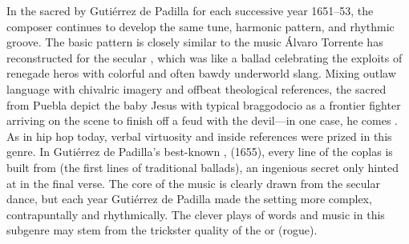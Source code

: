 In the sacred  by Gutiérrez de Padilla for each successive year
1651--53, the composer continues to develop the same tune, harmonic pattern,
and rhythmic groove.
The basic pattern is closely similar to the music Álvaro Torrente has
reconstructed for the secular , which was like a ballad
celebrating the exploits of renegade heros with colorful and often bawdy
underworld slang.%
    \Autocites
    {Torrente:Jacara}
    [512--514]{Torrente:VC-chapter}
Mixing outlaw language with chivalric imagery and offbeat theological
references, the sacred  from Puebla depict the baby Jesus with
typical braggodocio as a frontier fighter arriving on the scene to finish off
a feud with the devil---in one case, he comes .
As in hip hop today, verbal virtuosity and inside references were prized in
this genre. 
In Gutiérrez de Padilla's best-known ,  (1655), every line of the coplas is built from  (the first lines of traditional  ballads), an
ingenious secret only hinted at in the final verse.
The core of the music is clearly drawn from the secular dance, but each year
Gutiérrez de Padilla made the setting more complex, contrapuntally and
rhythmically.
The clever plays of words and music in this subgenre may stem from the
trickster quality of the  or  (rogue).


